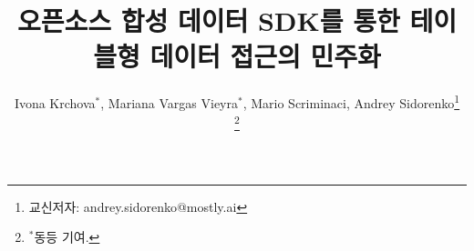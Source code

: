 \documentclass[journal]{IEEEtran}
\begin{document}
%
\title{오픈소스 합성 데이터 SDK를 통한 테이블형 데이터 접근의 민주화}
%
%
%



\author{
    Ivona Krchova$^{\ast}$,
    Mariana Vargas Vieyra$^{\ast}$,
    Mario Scriminaci,
    Andrey Sidorenko\thanks{교신저자: andrey.sidorenko@mostly.ai}
    \\
    \thanks{$^\ast$동등 기여.}
}

% 
%
\end{document}
